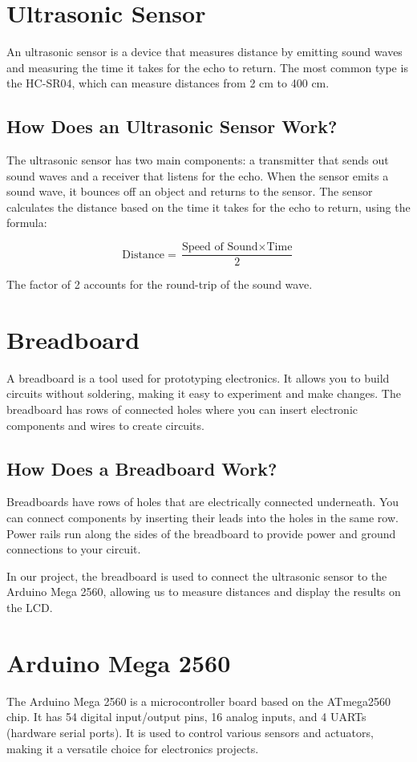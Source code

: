 \documentclass{article}
\begin{document}
\section{Ultrasonic Sensor}
An ultrasonic sensor is a device that measures distance by emitting sound waves and measuring the time it takes for the echo to return. The most common type is the HC-SR04, which can measure distances from 2 cm to 400 cm.

\subsection{How Does an Ultrasonic Sensor Work?}
The ultrasonic sensor has two main components: a transmitter that sends out sound waves and a receiver that listens for the echo. When the sensor emits a sound wave, it bounces off an object and returns to the sensor. The sensor calculates the distance based on the time it takes for the echo to return, using the formula:

\[
\text{Distance} = \frac{\text{Speed of Sound} \times \text{Time}}{2}
\]

The factor of 2 accounts for the round-trip of the sound wave.

\section{Breadboard}
A breadboard is a tool used for prototyping electronics. It allows you to build circuits without soldering, making it easy to experiment and make changes. The breadboard has rows of connected holes where you can insert electronic components and wires to create circuits.

\subsection{How Does a Breadboard Work?}
Breadboards have rows of holes that are electrically connected underneath. You can connect components by inserting their leads into the holes in the same row. Power rails run along the sides of the breadboard to provide power and ground connections to your circuit.

In our project, the breadboard is used to connect the ultrasonic sensor to the Arduino Mega 2560, allowing us to measure distances and display the results on the LCD.

\section{Arduino Mega 2560}
The Arduino Mega 2560 is a microcontroller board based on the ATmega2560 chip. It has 54 digital input/output pins, 16 analog inputs, and 4 UARTs (hardware serial ports). It is used to control various sensors and actuators, making it a versatile choice for electronics projects.
\end{document}
